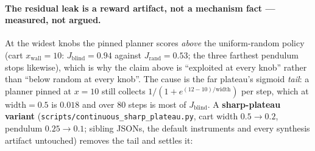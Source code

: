 \documentclass[11pt]{article}
\theoremstyle{definition}
\theoremstyle{remark}
\begin{document}
\paragraph{The residual leak is a reward artifact, not a mechanism fact --- measured, not argued.} At the widest knobs the pinned planner scores \emph{above} the uniform-random policy (cart $x_\mathrm{wall}=10$: $J_\mathrm{blind} = 0.94$ against $J_\mathrm{rand} = 0.53$; the three farthest pendulum stops likewise), which is why the claim above is ``exploited at every knob'' rather than ``below random at every knob''. The cause is the far plateau's sigmoid \emph{tail}: a planner pinned at $x = 10$ still collects $1/(1+e^{(12-10)/\mathrm{width}})$ per step, which at $\mathrm{width} = 0.5$ is $0.018$ and over 80 steps is most of $J_\mathrm{blind}$. A \textbf{sharp-plateau variant} (\texttt{scripts/continuous\_sharp\_plateau.py}, cart width $0.5 \to 0.2$, pendulum $0.25 \to 0.1$; sibling JSONs, the default instruments and every synthesis artifact untouched) removes the tail and settles it:
\end{document}
